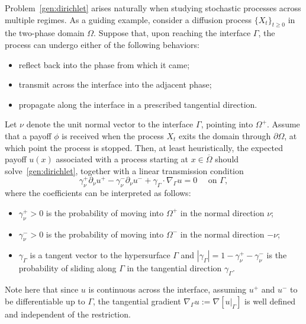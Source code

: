 \documentclass[letter,11pt]{amsart}
\theoremstyle{definition}
\numberwithin{equation}{section}
\begin{document}
Problem~\eqref{gen:dirichlet} arises naturally when studying stochastic processes across multiple regimes.
As a guiding example, consider a diffusion process $\{X_t\}_{t \geq 0}$ in the two-phase domain $\Omega$.
Suppose that, upon reaching the interface $\Gamma$, the process can undergo either of the following behaviors:
\begin{itemize}
\item reflect back into the phase from which it came;
\item transmit across the interface into the adjacent phase;
\item propagate along the interface in a prescribed tangential direction.
\end{itemize}
Let $\nu$ denote the unit normal vector to the interface $\Gamma$, pointing into $\Omega^{+}$.
Assume that a payoff $\phi$ is received when the process $X_t$ exits the domain through $\partial\Omega$, at which point the process is stopped.
Then, at least heuristically, the expected payoff $u(x)$ associated with a process starting at $x \in \overline{\Omega}$ should solve~\eqref{gen:dirichlet}, together with a linear transmission condition
\begin{equation}
\label{trans1}
\gamma_{\nu}^{+} \partial_{\nu}u^{+} - \gamma_{\nu}^{-} \partial_{\nu} u^{-} 
+ \gamma_{\Gamma} \cdot \nabla_{\Gamma} u 
= 0 
\quad \text{ on } \Gamma,
\end{equation}
where the coefficients can be interpreted as follows:
\begin{itemize}
\item $\gamma_{\nu}^{+} >0$ is the probability of moving into $\Omega^{+}$ in the normal direction $\nu$;
\item $\gamma_{\nu}^{-} > 0$ is the probability of moving into $\Omega^{-}$ in the normal direction $-\nu$;
\item $\gamma_{\Gamma}$ is a tangent vector to the hypersurface $\Gamma$ and $|\gamma_{\Gamma}| = 1 - \gamma_{\nu}^{+} - \gamma_{\nu}^{-}$ is the probability of sliding along $\Gamma$ in the tangential direction $\gamma_{\Gamma}$.
\end{itemize}
Note here that since $u$ is continuous across the interface, assuming $u^{+}$ and $u^{-}$ to be differentiable up to $\Gamma$, the tangential gradient $\nabla_{\Gamma} u := \nabla [ u|_{\Gamma}]$ is well defined and independent of the restriction.

\medskip
\end{document}
